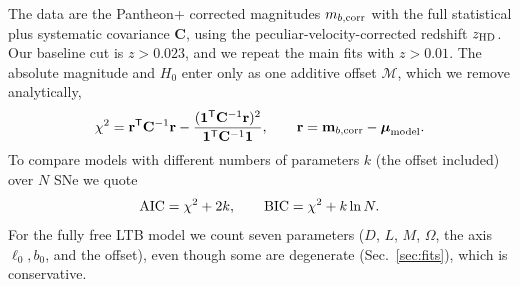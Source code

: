 \documentclass[10pt,twocolumn,letterpaper]{article}
\begin{document}
The data are the Pantheon+ corrected magnitudes $m_{b,\rm corr}$ with the full statistical plus systematic covariance $\mathbf C$, using the peculiar-velocity-corrected redshift $z_{\rm HD}$. Our baseline cut is $z>0.023$, and we repeat the main fits with $z>0.01$. The absolute magnitude and $H_0$ enter only as one additive offset $\mathcal M$, which we remove analytically,
\begin{equation}\label{eq:chi2}
\chi^2=\mathbf r^{\sf T}\mathbf C^{-1}\mathbf r-\frac{(\mathbf 1^{\sf T}\mathbf C^{-1}\mathbf r)^2}{\mathbf 1^{\sf T}\mathbf C^{-1}\mathbf 1},\qquad \mathbf r=\mathbf m_{b,\rm corr}-\boldsymbol\mu_{\rm model}.
\end{equation}
To compare models with different numbers of parameters $k$ (the offset included) over $N$ SNe we quote
\begin{equation}\label{eq:ic}
{\rm AIC}=\chi^2+2k,\qquad {\rm BIC}=\chi^2+k\ln N .
\end{equation}
For the fully free LTB model we count seven parameters ($D$, $L$, $M$, $\Omega$, the axis $\ell_0,b_0$, and the offset), even though some are degenerate (Sec.~\ref{sec:fits}), which is conservative.
\end{document}
